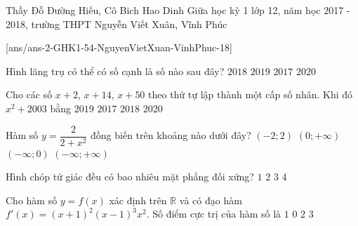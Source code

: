 \begin{name}
{Thầy Đỗ Đường Hiếu, Cô Bich Hao Dinh}
{Giữa học kỳ 1 lớp 12, năm học 2017 - 2018, trường THPT Nguyễn Viết Xuân, Vĩnh Phúc}
\end{name}
\setcounter{ex}{0}
[ans/ans-2-GHK1-54-NguyenVietXuan-VinhPhuc-18]
\begin{ex}%
Hình lăng trụ có thể có số cạnh là số nào sau đây?
\choice
{$2018$}
{\True $2019$}
{$2017$}
{$2020$}
\end{ex}

\begin{ex}%
Cho các số $x+2$, $x+14$, $x+50$ theo thứ tự lập thành một cấp số nhân. Khi đó $x^{2}+2003$ bằng
\choice
{\True $2019$}
{$2017$}
{$2018$}
{$2020$}
\end{ex}

\begin{ex}%
Hàm số $y=\dfrac{2}{2+x^{2}}$ đồng biến trên khoảng nào dưới đây?
\choice
{$\left(-2;2\right)$}
{$\left(0;+\infty \right)$}
{\True $\left(-\infty;0\right)$}
{$\left(-\infty;+\infty\right)$}
\end{ex}


\begin{ex}%
Hình chóp tứ giác đều có bao nhiêu mặt phẳng đối xứng?
\choice
{$1$}
{$2$}
{$3$}
{\True $4$}
\loigiai{

}
\end{ex}


\begin{ex}%
Cho hàm số $y=f\left(x\right)$ xác định trên $\mathbb{R}$ và có đạo hàm $f'\left(x\right)=\left(x+1\right)^{2}\left(x-1\right)^{3}x^{2}$. Số điểm cực trị của hàm số là
\choice
{\True $1$}
{$0$}
{$2$}
{$3$}
\end{ex}


